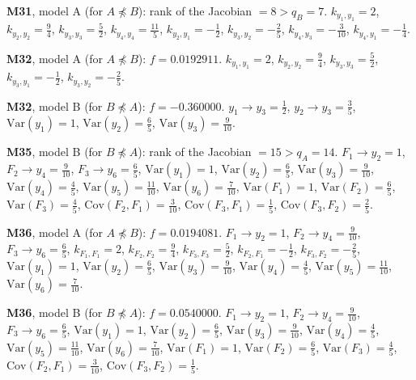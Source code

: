 \documentclass[10pt,a4paper]{article}
\newcommand{\nnest}{\not\preceq}
\begin{document}
{\noindent\textbf{M31}, model A (for $A\nnest B$): rank of the Jacobian $=8>q_B=7$. {\footnotesize $k_{y_{1},y_{1}}=2$, $k_{y_{2},y_{2}}=\tfrac{9}{4}$, $k_{y_{3},y_{3}}=\tfrac{5}{2}$, $k_{y_{4},y_{4}}=\tfrac{11}{5}$, $k_{y_{2},y_{1}}=-\tfrac{1}{2}$, $k_{y_{3},y_{2}}=-\tfrac{2}{5}$, $k_{y_{4},y_{3}}=-\tfrac{3}{10}$, $k_{y_{4},y_{1}}=-\tfrac{1}{4}$.}\par\smallskip
\noindent\textbf{M32}, model A (for $A\nnest B$): $f=0.0192911$. {\footnotesize $k_{y_{1},y_{1}}=2$, $k_{y_{2},y_{2}}=\tfrac{9}{4}$, $k_{y_{3},y_{3}}=\tfrac{5}{2}$, $k_{y_{3},y_{1}}=-\tfrac{1}{2}$, $k_{y_{3},y_{2}}=-\tfrac{2}{5}$.}\par\smallskip
\noindent\textbf{M32}, model B (for $B\nnest A$): $f=-0.360000$. {\footnotesize $y_{1}\to y_{3}=\tfrac{1}{2}$, $y_{2}\to y_{3}=\tfrac{3}{5}$, $\mathrm{Var}(y_{1})=1$, $\mathrm{Var}(y_{2})=\tfrac{6}{5}$, $\mathrm{Var}(y_{3})=\tfrac{9}{10}$.}\par\smallskip
\noindent\textbf{M35}, model B (for $B\nnest A$): rank of the Jacobian $=15>q_A=14$. {\footnotesize $F_{1}\to y_{2}=1$, $F_{2}\to y_{4}=\tfrac{9}{10}$, $F_{3}\to y_{6}=\tfrac{6}{5}$, $\mathrm{Var}(y_{1})=1$, $\mathrm{Var}(y_{2})=\tfrac{6}{5}$, $\mathrm{Var}(y_{3})=\tfrac{9}{10}$, $\mathrm{Var}(y_{4})=\tfrac{4}{5}$, $\mathrm{Var}(y_{5})=\tfrac{11}{10}$, $\mathrm{Var}(y_{6})=\tfrac{7}{10}$, $\mathrm{Var}(F_{1})=1$, $\mathrm{Var}(F_{2})=\tfrac{6}{5}$, $\mathrm{Var}(F_{3})=\tfrac{4}{5}$, $\mathrm{Cov}(F_{2},F_{1})=\tfrac{3}{10}$, $\mathrm{Cov}(F_{3},F_{1})=\tfrac{1}{5}$, $\mathrm{Cov}(F_{3},F_{2})=\tfrac{2}{5}$.}\par\smallskip
\noindent\textbf{M36}, model A (for $A\nnest B$): $f=0.0194081$. {\footnotesize $F_{1}\to y_{2}=1$, $F_{2}\to y_{4}=\tfrac{9}{10}$, $F_{3}\to y_{6}=\tfrac{6}{5}$, $k_{F_{1},F_{1}}=2$, $k_{F_{2},F_{2}}=\tfrac{9}{4}$, $k_{F_{3},F_{3}}=\tfrac{5}{2}$, $k_{F_{2},F_{1}}=-\tfrac{1}{2}$, $k_{F_{3},F_{2}}=-\tfrac{2}{5}$, $\mathrm{Var}(y_{1})=1$, $\mathrm{Var}(y_{2})=\tfrac{6}{5}$, $\mathrm{Var}(y_{3})=\tfrac{9}{10}$, $\mathrm{Var}(y_{4})=\tfrac{4}{5}$, $\mathrm{Var}(y_{5})=\tfrac{11}{10}$, $\mathrm{Var}(y_{6})=\tfrac{7}{10}$.}\par\smallskip
\noindent\textbf{M36}, model B (for $B\nnest A$): $f=0.0540000$. {\footnotesize $F_{1}\to y_{2}=1$, $F_{2}\to y_{4}=\tfrac{9}{10}$, $F_{3}\to y_{6}=\tfrac{6}{5}$, $\mathrm{Var}(y_{1})=1$, $\mathrm{Var}(y_{2})=\tfrac{6}{5}$, $\mathrm{Var}(y_{3})=\tfrac{9}{10}$, $\mathrm{Var}(y_{4})=\tfrac{4}{5}$, $\mathrm{Var}(y_{5})=\tfrac{11}{10}$, $\mathrm{Var}(y_{6})=\tfrac{7}{10}$, $\mathrm{Var}(F_{1})=1$, $\mathrm{Var}(F_{2})=\tfrac{6}{5}$, $\mathrm{Var}(F_{3})=\tfrac{4}{5}$, $\mathrm{Cov}(F_{2},F_{1})=\tfrac{3}{10}$, $\mathrm{Cov}(F_{3},F_{2})=\tfrac{1}{5}$.}\par\smallskip
}
\end{document}
